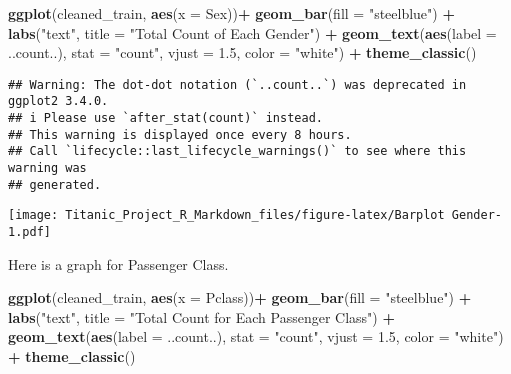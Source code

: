 \documentclass[
]{article}
\newenvironment{Shaded}{\begin{snugshade}}{\end{snugshade}}
\newcommand{\AttributeTok}[1]{\textcolor[rgb]{0.13,0.29,0.53}{#1}}
\newcommand{\FloatTok}[1]{\textcolor[rgb]{0.00,0.00,0.81}{#1}}
\newcommand{\FunctionTok}[1]{\textcolor[rgb]{0.13,0.29,0.53}{\textbf{#1}}}
\newcommand{\NormalTok}[1]{#1}
\newcommand{\SpecialCharTok}[1]{\textcolor[rgb]{0.81,0.36,0.00}{\textbf{#1}}}
\newcommand{\StringTok}[1]{\textcolor[rgb]{0.31,0.60,0.02}{#1}}
\begin{document}
\begin{Shaded}
\begin{Highlighting}[]
\FunctionTok{ggplot}\NormalTok{(cleaned\_train, }\FunctionTok{aes}\NormalTok{(}\AttributeTok{x =}\NormalTok{ Sex))}\SpecialCharTok{+} 
  \FunctionTok{geom\_bar}\NormalTok{(}\AttributeTok{fill =} \StringTok{"steelblue"}\NormalTok{) }\SpecialCharTok{+} 
  \FunctionTok{labs}\NormalTok{(}\StringTok{"text"}\NormalTok{, }\AttributeTok{title =} \StringTok{"Total Count of Each Gender"}\NormalTok{) }\SpecialCharTok{+}
  \FunctionTok{geom\_text}\NormalTok{(}\FunctionTok{aes}\NormalTok{(}\AttributeTok{label =}\NormalTok{ ..count..), }\AttributeTok{stat =} \StringTok{"count"}\NormalTok{, }\AttributeTok{vjust =} \FloatTok{1.5}\NormalTok{, }\AttributeTok{color =} \StringTok{"white"}\NormalTok{) }\SpecialCharTok{+}
  \FunctionTok{theme\_classic}\NormalTok{()}
\end{Highlighting}
\end{Shaded}

\begin{verbatim}
## Warning: The dot-dot notation (`..count..`) was deprecated in ggplot2 3.4.0.
## i Please use `after_stat(count)` instead.
## This warning is displayed once every 8 hours.
## Call `lifecycle::last_lifecycle_warnings()` to see where this warning was
## generated.
\end{verbatim}

\texttt{[image: Titanic\_Project\_R\_Markdown\_files/figure-latex/Barplot Gender-1.pdf]}

Here is a graph for Passenger Class.

\begin{Shaded}
\begin{Highlighting}[]
\FunctionTok{ggplot}\NormalTok{(cleaned\_train, }\FunctionTok{aes}\NormalTok{(}\AttributeTok{x =}\NormalTok{ Pclass))}\SpecialCharTok{+} 
  \FunctionTok{geom\_bar}\NormalTok{(}\AttributeTok{fill =} \StringTok{"steelblue"}\NormalTok{) }\SpecialCharTok{+} 
  \FunctionTok{labs}\NormalTok{(}\StringTok{"text"}\NormalTok{, }\AttributeTok{title =} \StringTok{"Total Count for Each Passenger Class"}\NormalTok{) }\SpecialCharTok{+}
  \FunctionTok{geom\_text}\NormalTok{(}\FunctionTok{aes}\NormalTok{(}\AttributeTok{label =}\NormalTok{ ..count..), }\AttributeTok{stat =} \StringTok{"count"}\NormalTok{, }\AttributeTok{vjust =} \FloatTok{1.5}\NormalTok{, }\AttributeTok{color =} \StringTok{"white"}\NormalTok{) }\SpecialCharTok{+}
  \FunctionTok{theme\_classic}\NormalTok{()}
\end{Highlighting}
\end{Shaded}
\end{document}
